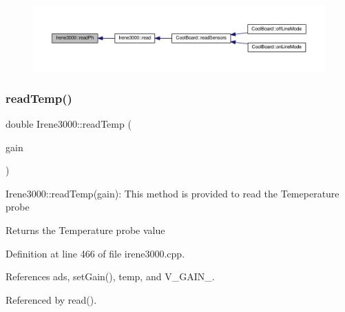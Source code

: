 \begin{figure}[H]
\begin{center}
\leavevmode
\includegraphics[width=350pt]{classIrene3000_abf3db725fabb0634ec889b32068a5eec_icgraph}
\end{center}
\end{figure}
\mbox{\label{classIrene3000_a94ad40f281d83ad1be20bf1edd6fe802}} 
\subsubsection{\texorpdfstring{read\+Temp()}{readTemp()}}
{\footnotesize\ttfamily double Irene3000\+::read\+Temp (\begin{DoxyParamCaption}\item[{ads\+Gain\+\_\+t}]{gain }\end{DoxyParamCaption})}

Irene3000\+::read\+Temp(gain)\+: This method is provided to read the Temeperature probe

\begin{DoxyReturn}{Returns}
the Temperature probe value 
\end{DoxyReturn}


Definition at line 466 of file irene3000.\+cpp.



References ads, set\+Gain(), temp, and V\+\_\+\+G\+A\+I\+N\+\_.



Referenced by read().


